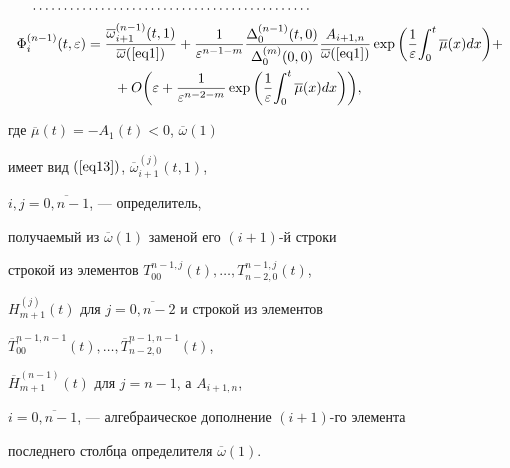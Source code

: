 \begin{lem}
\begin{align*}
%


\dotsb\dotsb\dotsb&\dotsb\dotsb\dotsb\dotsb\dotsb\dotsb


\dotsb\dotsb\dotsb\dotsb\dotsb\dotsb \\


%


\Phi _{i}^{(n - 1)} (t,\varepsilon ) &=


{\frac{{\overline {\omega} _{i + 1}^{(n - 


1)} (t,1)}}{{\overline {\omega} (\ref{eq1})}}} +


{\frac{{1}}{{\varepsilon ^{n - 1 - m}}}} 


{\frac{{\Delta _{0}^{(n - 1)} (t,0)}}{{\Delta _{0}^{(m)} (0,0)}}} 


{\frac{{A_{i + 1,n}}} {{\overline {\omega} (\ref{eq1})}}}\exp \bigg( 


{{\frac{{1}}{{\varepsilon}} }{\int_{0}^{t} {\overline {\mu} (x)dx}}}  


\bigg) + \\ 


&\qquad+O\bigg({\varepsilon + {\frac{{1}}{{\varepsilon ^{n - 2 - m}}}}\exp 


\bigg( {{\frac{{1}}{{\varepsilon}} }{\int_{0}^{t} {\overline {\mu} (x)dx} 


}} \bigg)} \bigg), 


\end{align*}


где $\overline {\mu}(t)=-A_{1}(t)<0$, $\overline{\omega}(1)$ 


имеет вид $(\ref{eq13})$, $\overline {\omega}_{i+1}^{(j)}(t,1)$, 


$i,j=\overline{0,n-1}$, --- определитель, 


получаемый из $\overline{\omega}(1)$ заменой его $(i+1)$-й строки 


строкой из элементов $T_{00}^{n-1,j}(t), \dotsc, T_{n-2,0}^{n-1,j}(t)$, 


$H_{m+1}^{(j)}(t)$ для $j=\overline{0,n-2}$ и строкой из элементов 


$\overline{T}_{00}^{n-1,n-1}(t),\dotsc, \overline{T}_{n-2,0}^{n-1,n-1}(t)$, 


$\overline{H}_{m+1}^{(n-1)}(t)$ для $j=n-1$, а $A_{i+1,n}$, 


$i=\overline {0,n-1}$, --- алгебраическое дополнение $(i+1)$-го элемента 


последнего столбца определителя $\overline {\omega}(1)$.


\end{lem}





